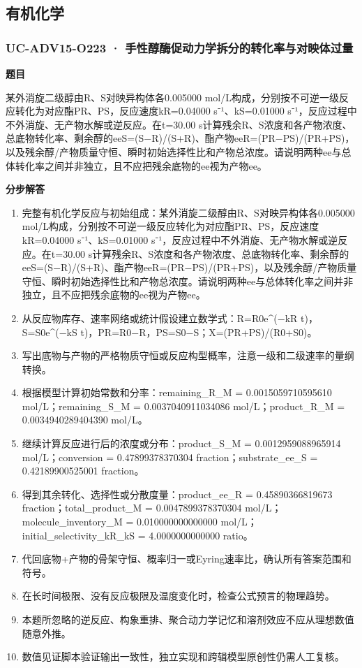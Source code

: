 \documentclass[UTF8,11pt,a4paper]{ctexart}
\begin{document}
\subsection*{有机化学}
\subsubsection*{UC-ADV15-O223 · 手性醇酶促动力学拆分的转化率与对映体过量}
\noindent\textbf{题目}\par
某外消旋二级醇由R、S对映异构体各0.005000 mol/L构成，分别按不可逆一级反应转化为对应酯PR、PS，反应速度kR=0.04000 s⁻¹、kS=0.01000 s⁻¹，反应过程中不外消旋、无产物水解或逆反应。在t=30.00 s计算残余R、S浓度和各产物浓度、总底物转化率、剩余醇的eeS=(S−R)/(S+R)、酯产物eeR=(PR−PS)/(PR+PS)，以及残余醇/产物质量守恒、瞬时初始选择性比和产物总浓度。请说明两种ee与总体转化率之间并非独立，且不应把残余底物的ee视为产物ee。\par
\medskip\noindent\textbf{分步解答}
\begin{enumerate}
\item 完整有机化学反应与初始组成：某外消旋二级醇由R、S对映异构体各0.005000 mol/L构成，分别按不可逆一级反应转化为对应酯PR、PS，反应速度kR=0.04000 s⁻¹、kS=0.01000 s⁻¹，反应过程中不外消旋、无产物水解或逆反应。在t=30.00 s计算残余R、S浓度和各产物浓度、总底物转化率、剩余醇的eeS=(S−R)/(S+R)、酯产物eeR=(PR−PS)/(PR+PS)，以及残余醇/产物质量守恒、瞬时初始选择性比和产物总浓度。请说明两种ee与总体转化率之间并非独立，且不应把残余底物的ee视为产物ee。
\item 从反应物库存、速率网络或统计假设建立数学式：R=R0e\textasciicircum{}(−kR t)，S=S0e\textasciicircum{}(−kS t)，PR=R0−R，PS=S0−S；X=(PR+PS)/(R0+S0)。
\item 写出底物与产物的严格物质守恒或反应构型概率，注意一级和二级速率的量纲转换。
\item 根据模型计算初始常数和分率：remaining\_R\_M = 0.0015059710595610 mol/L；remaining\_S\_M = 0.0037040911034086 mol/L；product\_R\_M = 0.0034940289404390 mol/L。
\item 继续计算反应进行后的浓度或分布：product\_S\_M = 0.0012959088965914 mol/L；conversion = 0.47899378370304 fraction；substrate\_ee\_S = 0.42189900525001 fraction。
\item 得到其余转化、选择性或分散度量：product\_ee\_R = 0.45890366819673 fraction；total\_product\_M = 0.0047899378370304 mol/L；molecule\_inventory\_M = 0.010000000000000 mol/L；initial\_selectivity\_kR\_kS = 4.0000000000000 ratio。
\item 代回底物+产物的骨架守恒、概率归一或Eyring速率比，确认所有答案范围和符号。
\item 在长时间极限、没有反应极限及温度变化时，检查公式预言的物理趋势。
\item 本题所忽略的逆反应、构象重排、聚合动力学记忆和溶剂效应不应从理想数值随意外推。
\item 数值见证脚本验证输出一致性，独立实现和跨辑模型原创性仍需人工复核。
\end{enumerate}
\end{document}

